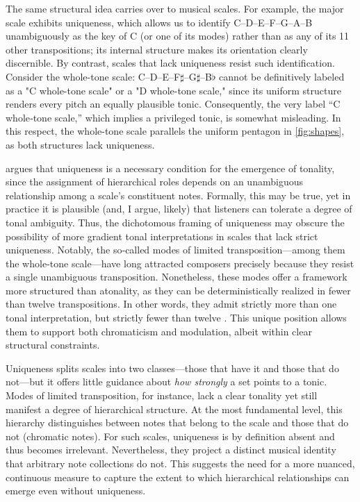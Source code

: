 \documentclass[10pt,twocolumn]{article}
\numberwithin{equation}{section} %
\begin{document}
    The same structural idea carries over to musical scales.
    For example, the major scale exhibits uniqueness, which allows us to identify C–D–E–F–G–A–B unambiguously as the key of C (or one of its modes) rather than as any of its 11 other transpositions; its internal structure makes its orientation clearly discernible.
    By contrast, scales that lack uniqueness resist such identification.
    Consider the whole-tone scale: C–D–E–F$\sharp$–G$\sharp$–B$\flat$ cannot be definitively labeled as a "C whole-tone scale" or a "D whole-tone scale," since its uniform structure renders every pitch an equally plausible tonic.
    Consequently, the very label “C whole‑tone scale,” which implies a privileged tonic, is somewhat misleading.
    In this respect, the whole-tone scale parallels the uniform pentagon in \autoref{fig:shapes}, as both structures lack uniqueness.

    \citet{Balzano1982} argues that uniqueness is a necessary condition for the emergence of tonality, since the assignment of hierarchical roles depends on an unambiguous relationship among a scale's constituent notes.
    Formally, this may be true, yet in practice it is plausible (and, I argue, likely) that listeners can tolerate a degree of tonal ambiguity.
    Thus, the dichotomous framing of uniqueness may obscure the possibility of more gradient tonal interpretations in scales that lack strict uniqueness.
    Notably, the so‑called modes of limited transposition—among them the whole‑tone scale—have long attracted composers precisely because they resist a single unambiguous transposition.
    Nonetheless, these modes offer a framework more structured than atonality, as they can be deterministically realized in fewer than twelve transpositions.
    In other words, they admit strictly more than one tonal interpretation, but strictly fewer than twelve \citep{Messiaen1944}.
    This unique position allows them to support both chromaticism and modulation, albeit within clear structural constraints.

    Uniqueness splits scales into two classes—those that have it and those that do not—but it offers little guidance about \emph{how strongly} a set points to a tonic.
    Modes of limited transposition, for instance, lack a clear tonality yet still manifest a degree of hierarchical structure.
    At the most fundamental level, this hierarchy distinguishes between notes that belong to the scale and those that do not (chromatic notes).
    For such scales, uniqueness is by definition absent and thus becomes irrelevant.
    Nevertheless, they project a distinct musical identity that arbitrary note collections do not.
    This suggests the need for a more nuanced, continuous measure to capture the extent to which hierarchical relationships can emerge even without uniqueness.
\end{document}
